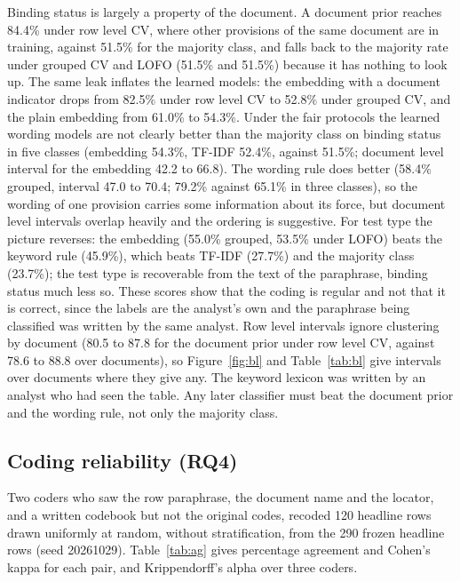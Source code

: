\documentclass[conference]{IEEEtran}
\begin{document}
Binding status is largely a property of the document. A document prior reaches 84.4\% under row level CV, where other provisions of the same document are in training, against 51.5\% for the majority class, and falls back to the majority rate under grouped CV and LOFO (51.5\% and 51.5\%) because it has nothing to look up. The same leak inflates the learned models: the embedding with a document indicator drops from 82.5\% under row level CV to 52.8\% under grouped CV, and the plain embedding from 61.0\% to 54.3\%. Under the fair protocols the learned wording models are not clearly better than the majority class on binding status in five classes (embedding 54.3\%, TF-IDF 52.4\%, against 51.5\%; document level interval for the embedding 42.2 to 66.8). The wording rule does better (58.4\% grouped, interval 47.0 to 70.4; 79.2\% against 65.1\% in three classes), so the wording of one provision carries some information about its force, but document level intervals overlap heavily and the ordering is suggestive. For test type the picture reverses: the embedding (55.0\% grouped, 53.5\% under LOFO) beats the keyword rule (45.9\%), which beats TF-IDF (27.7\%) and the majority class (23.7\%); the test type is recoverable from the text of the paraphrase, binding status much less so. These scores show that the coding is regular and not that it is correct, since the labels are the analyst's own and the paraphrase being classified was written by the same analyst. Row level intervals ignore clustering by document (80.5 to 87.8 for the document prior under row level CV, against 78.6 to 88.8 over documents), so Figure~\ref{fig:bl} and Table~\ref{tab:bl} give intervals over documents where they give any. The keyword lexicon was written by an analyst who had seen the table. Any later classifier must beat the document prior and the wording rule, not only the majority class.

\subsection{Coding reliability (RQ4)}
Two coders who saw the row paraphrase, the document name and the locator, and a written codebook but not the original codes, recoded 120 headline rows drawn uniformly at random, without stratification, from the 290 frozen headline rows (seed 20261029). Table~\ref{tab:ag} gives percentage agreement and Cohen's kappa for each pair, and Krippendorff's alpha over three coders.
\end{document}
